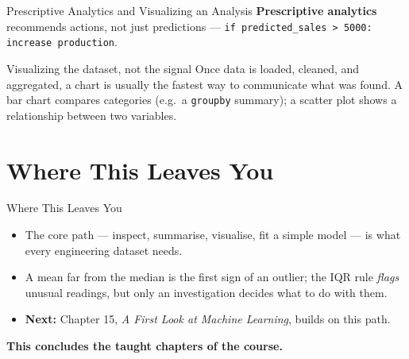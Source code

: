 \documentclass[9pt,aspectratio=169,xcolor=table]{beamer}
\begin{document}
\begin{frame}{Prescriptive Analytics and Visualizing an Analysis}
    \leavevmode
    \small
    \textbf{Prescriptive analytics} recommends actions, not just
    predictions --- \texttt{if predicted\_sales > 5000: increase
    production}.

    \vspace{3mm}
    \begin{block}{Visualizing the dataset, not the signal}
        Once data is loaded, cleaned, and aggregated, a chart is usually
        the fastest way to communicate what was found. A \alert{bar
        chart} compares categories (e.g.\ a \texttt{groupby} summary); a
        \alert{scatter plot} shows a relationship between two variables.
    \end{block}
\end{frame}

\section{Where This Leaves You}

\begin{frame}{Where This Leaves You}
    \leavevmode
    \small
    \begin{itemize}
        \item The \alert{core path} --- inspect, summarise, visualise,
              fit a simple model --- is what every engineering dataset
              needs.
        \item A mean far from the median is the first sign of an
              outlier; the IQR rule \emph{flags} unusual readings, but
              only an investigation decides what to do with them.
        \item \textbf{Next:} Chapter 15, \emph{A First Look at Machine
              Learning}, builds on this path.
    \end{itemize}

    \vspace{4mm}
    \begin{center}
        \large\color{primary}\textbf{This concludes the taught chapters
        of the course.}
    \end{center}
\end{frame}
\end{document}
